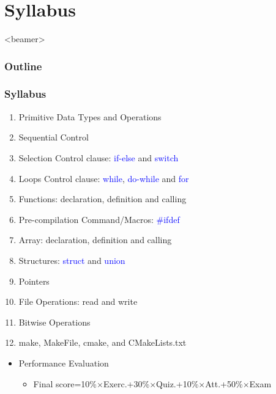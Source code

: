 \section{Syllabus}
\label{sec:sylla}
\begin{frame}<beamer>
    \frametitle{Outline}
    \tableofcontents[currentsection]
\end{frame}

\begin{frame}
	\frametitle{Syllabus}
	\begin{enumerate}
		\item {Primitive Data Types and Operations}
		\item {Sequential Control}
		\item {Selection Control clause: \textcolor{blue}{if-else} and \textcolor{blue}{switch}}
		\item {Loops Control clause: \textcolor{blue}{while}, \textcolor{blue}{do-while} and \textcolor{blue}{for}}
		\item {Functions: declaration, definition and calling}
		\item {Pre-compilation Command/Macros: \textcolor{blue}{\#ifdef}}
		\item {Array: declaration, definition and calling}
		\item {Structures: \textcolor{blue}{struct} and \textcolor{blue}{union}}
		\item {Pointers}
		\item {File Operations: read and write}
		\item {Bitwise Operations}
		\item {make, MakeFile, cmake, and CMakeLists.txt}
	\end{enumerate}
	\begin{itemize}
		\item {Performance Evaluation}
		\begin{itemize}
			\item {Final score=10\%{$\times$}Exerc.+30\%{$\times$}Quiz.+10\%{$\times$}Att.+50\%{$\times$}Exam}
		\end{itemize}
	\end{itemize}
\end{frame}


